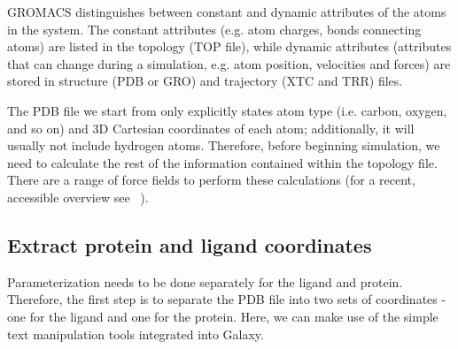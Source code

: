 \documentclass[twocolumn]{bmcart}%
\begin{document}
GROMACS distinguishes between constant and dynamic attributes of the
atoms in the system. The constant attributes (e.g. atom charges, bonds
connecting atoms) are listed in the topology (TOP file), while dynamic
attributes (attributes that can change during a simulation, e.g. atom
position, velocities and forces) are stored in structure (PDB or GRO)
and trajectory (XTC and TRR) files.

The PDB file we start from only explicitly states atom type (i.e. carbon, oxygen, and so on) and
3D Cartesian coordinates of each atom; additionally, it will usually not include hydrogen atoms. Therefore, before beginning simulation, we need to calculate
the rest of the information contained within the topology file. There
are a range of force fields to perform these calculations (for a recent, accessible overview see ~\cite{Lemkul2020}).


\subsection*{Extract protein and ligand
coordinates}\label{extract-protein-and-ligand-coordinates}

Parameterization needs to be done separately for the ligand and protein.
Therefore, the first step is to separate the PDB file into two sets of
coordinates - one for the ligand and one for the protein. Here, we can make use of the simple text manipulation tools integrated into Galaxy.
\end{document}
